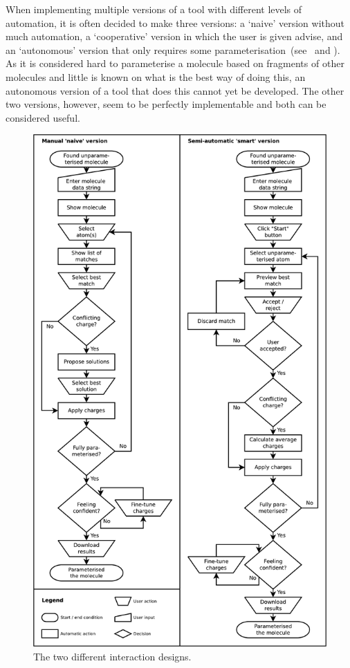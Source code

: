 When implementing multiple versions of a tool with different levels of automation, it is often decided to make three versions: a `naive' version without much automation, a `cooperative' version in which the user is given advise, and an `autonomous' version that only requires some parameterisation~(see~\cite{payne2000varying} and ). As it is considered hard to parameterise a molecule based on fragments of other molecules and little is known on what is the best way of doing this, an autonomous version of a tool that does this cannot yet be developed. The other two versions, however, seem to be perfectly implementable and both can be considered useful.

\begin{figure}[h!]
\begin{center}
\includegraphics[width=.9\textwidth]{img/complete_id.pdf}
\caption{The two different interaction designs.}
\vspace{-2cm}
\end{center}
\end{figure}

